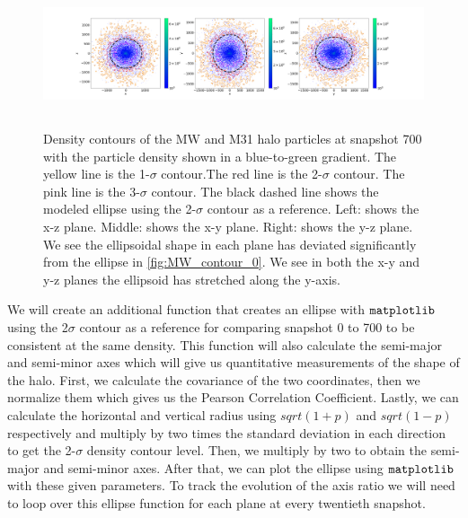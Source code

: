 \documentclass[linenumbers, twocolumn]{aastex631}
\begin{document}
\begin{figure}
    \centering
    \includegraphics[width=\textwidth,height=4.3cm]{figures/MW_M31_700_3subplots_Density.png}
    \caption{Density contours of the MW and M31 halo particles at snapshot 700 with the particle density shown in a blue-to-green gradient. The yellow line is the 1-$\sigma$ contour.The red line is the 2-$\sigma$ contour. The pink line is the 3-$\sigma$ contour. The black dashed line shows the modeled ellipse using the 2-$\sigma$ contour as a reference. Left: shows the x-z plane. Middle: shows the x-y plane. Right: shows the y-z plane. We see the ellipsoidal shape in each plane has deviated significantly from the ellipse in \ref{fig:MW_contour_0}. We see in both the x-y and y-z planes the ellipsoid has stretched along the y-axis.}
    \label{fig:MW_M31_contour_700}
\end{figure}

We will create an additional function that creates an ellipse with $\tt{matplotlib}$ using the 2$\sigma$ contour as a reference for comparing snapshot 0 to 700 to be consistent at the same density. This function will also calculate the semi-major and semi-minor axes which will give us quantitative measurements of the shape of the halo. First, we calculate the covariance of the two coordinates, then we normalize them which gives us the Pearson Correlation Coefficient. Lastly, we can calculate the horizontal and vertical radius using $sqrt(1+p)$ and $sqrt(1-p)$ respectively and multiply by two times the standard deviation in each direction to get the 2-$\sigma$ density contour level. Then, we multiply by two to obtain the semi-major and semi-minor axes. After that, we can plot the ellipse using $\tt{matplotlib}$ with these given parameters.
To track the evolution of the axis ratio we will need to loop over this ellipse function for each plane at every twentieth snapshot.


\end{document}
